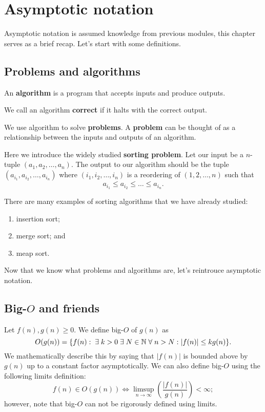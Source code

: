 \chapter{Asymptotic notation}

Asymptotic notation is assumed knowledge from previous modules, 
this chapter serves as a brief recap. 
Let's start with some definitions.

\section{Problems and algorithms}

\begin{definition}[Algorithm]
    An \textbf{algorithm} is a program that accepts inputs and produce outputs.
\end{definition}

We call an algorithm \textbf{correct} if it halts with the correct output.

We use algorithm to solve \textbf{problems}. 
A \textbf{problem} can be thought of as a relationship between the inputs and outputs of an algorithm.

\begin{example}[Sorting]
    Here we introduce the widely studied \textbf{sorting problem}. 
    Let our input be a $n$-tuple $(a_1, a_2, \ldots, a_n)$. 
    The output to our algorithm should be the tuple 
    $(a_{i_1}, a_{i_2}, \ldots, a_{i_n})$ 
    where $(i_1, i_2, \ldots, i_n)$ is a reordering of $(1, 2, \ldots, n)$ such that 
    \[ a_{i_1} \leq a_{i_2} \leq \ldots \leq a_{i_n}. \]

    There are many examples of sorting algorithms that we have already studied:
    \begin{enumerate}
        \item insertion sort;
        \item merge sort; and
        \item meap sort.
    \end{enumerate}
\end{example}

Now that we know what problems and algorithms are, let's reintrouce asymptotic notation.

\section{Big-$O$ and friends}

\begin{definition}[Big-$O$]
    Let $f(n), g(n) \geq 0$. 
    We define big-$O$ of $g(n)$ as 
    \[ O(g(n)) = 
        \{
        f(n) : \;\exists\; k > 0 \; \exists \; N \in \mathbb{N} \;\forall\; n > N : 
        \lvert f(n) \rvert \leq k g(n)
        \}.
    \] 
    We mathematically describe this by saying that 
    $\lvert f(n) \rvert$ 
    is bounded above by $g(n)$ up to a constant factor asymptotically. 
    We can also define big-$O$ using the following limits definition: 
    \[ f(n) \in O(g(n)) \iff 
        \limsup_{n\to\infty} \left(\frac{\lvert f(n) \rvert}{g(n)}\right) < \infty; 
    \] 
    however, note that big-$O$ can not be rigorously defined using limits.
\end{definition}

